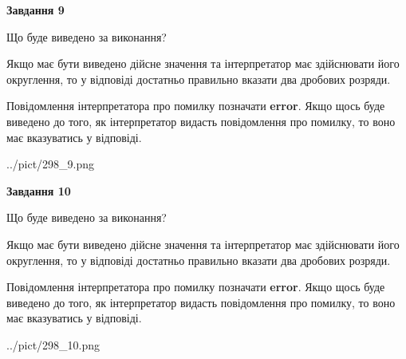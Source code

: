 \documentclass[12pt, ukrainian]{article}
\begin{document}
{\begin {Large}
{\begin {center}\textbf{Завдання 9}\end {center}}\par
Що буде виведено за виконання? \par

Якщо має бути виведено дійсне значення та інтерпретатор має здійснювати його округлення, 
то у відповіді достатньо правильно вказати два дробових розряди.

Повідомлення інтерпретатора про помилку позначати \textbf{error}.
Якщо щось буде виведено до того, як інтерпретатор видасть повідомлення про помилку, 
то воно має вказуватись у відповіді. \par

\begin{center}
	{../pict/298_9.png}
\end{center}
\newpage

{\begin {center}\textbf{Завдання 10}\end {center}}\par
Що буде виведено за виконання? \par

Якщо має бути виведено дійсне значення та інтерпретатор має здійснювати його округлення, 
то у відповіді достатньо правильно вказати два дробових розряди.

Повідомлення інтерпретатора про помилку позначати \textbf{error}.
Якщо щось буде виведено до того, як інтерпретатор видасть повідомлення про помилку, 
то воно має вказуватись у відповіді. \par

\begin{center}
	{../pict/298_10.png}
\end{center}
\newpage

\end {Large}}
\end{document}
